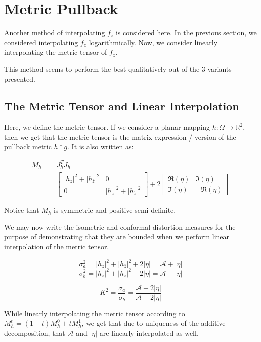 \section{Metric Pullback}

Another method of interpolating $f_z$ is considered here. In the previous section, we considered interpolating $f_z$ logarithmically. Now, we consider linearly interpolating the metric tensor of $f_z$. 

This method seems to perform the best qualitatively out of the 3 variants presented.

\subsection{The Metric Tensor and Linear Interpolation}

Here, we define the metric tensor. If we consider a planar mapping $h: \Omega \rightarrow \mathbb{R}^2$, then we get that the metric tensor is the matrix expression / version of the pullback metric $h*g$. It is also written as:

\begin{align*}
M_h &= J_h^T J_h \\
&= \begin{bmatrix}|h_z|^2 + |h_{\overline{z}}|^2 & 0 \\ 0 & |h_z|^2 + |h_{\overline{z}}|^2 \end{bmatrix} + 2 \begin{bmatrix}\Re(\eta) & \Im(\eta) \\ \Im(\eta) & -\Re(\eta) \end{bmatrix}
\end{align*}


Notice that $M_h$ is symmetric and positive semi-definite.


We may now write the isometric and conformal distortion measures for the purpose of demonstrating that they are bounded when we perform linear interpolation of the metric tensor.

$$\sigma_a^2 = |h_z|^2 + |h_{\overline{z}}|^2 + 2 |\eta| = \mathcal{A} + |\eta|$$
$$\sigma_b^2 = |h_z|^2 + |h_{\overline{z}}|^2 - 2 |\eta| = \mathcal{A} - |\eta|$$

$$K^2 = \frac{\sigma_a}{\sigma_b} = \frac{\mathcal{A} + 2|\eta|}{\mathcal{A} - 2 |\eta|}$$

While linearly interpolating the metric tensor according to $M_h^t = (1-t)M_h^0 + t M_h^1$, we get that due to uniqueness of the additive decomposition, that $\mathcal{A}$ and $|\eta|$ are linearly interpolated as well. %

